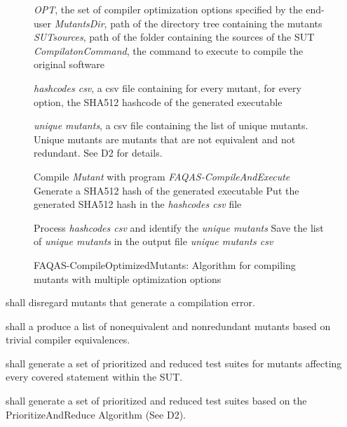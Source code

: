 \begin{figure}[h]
\begin{algorithmic}[1]

\scriptsize


\Require \emph{OPT}, the set of compiler optimization options specified by the end-user
\Require \emph{MutantsDir}, path of the directory tree containing the mutants
\Require \emph{SUTsources}, path of the folder containing the sources of the SUT
\Require \emph{CompilatonCommand}, the command to execute to compile the original software

\Ensure \emph{hashcodes csv}, a csv file containing for every mutant, for every option, the SHA512 hashcode of the generated executable

\Ensure \emph{unique mutants}, a csv file containing the list of unique mutants. Unique mutants are mutants that are not equivalent and not redundant. See D2 for details.

\State Compile \emph{Mutant} with program \emph{FAQAS-CompileAndExecute}
\State Generate a SHA512 hash of the generated executable
\State Put the generated SHA512 hash in the \emph{hashcodes csv} file
\EndFor
\EndFor

\State Process \emph{hashcodes csv} and identify the \emph{unique mutants}
\State Save the list of \emph{unique mutants} in the output file \emph{unique mutants csv} 

\end{algorithmic}
\caption{FAQAS-CompileOptimizedMutants: Algorithm for compiling mutants with multiple optimization options}
\label{alg:CompileOptimizedMutants}
\end{figure}


\RQ{} \FAQAS shall disregard mutants that generate a compilation error.

\RQ{} \FAQAS shall a produce a list of nonequivalent and nonredundant mutants based on trivial compiler equivalences. 

\RQ{} \FAQAS shall generate a set of prioritized and reduced test suites for mutants affecting every covered statement within the SUT.

\RQ{} \FAQAS shall generate a set of prioritized and reduced test suites based on the PrioritizeAndReduce Algorithm (See D2).

